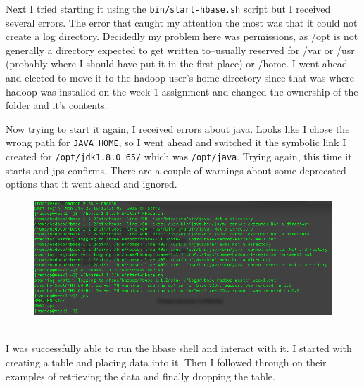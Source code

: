 \documentclass[10pt]{article}
\begin{document}
Next I tried starting it using the \verb|bin/start-hbase.sh| script but I received several errors. The error that caught my attention the most was that it could not create a log directory. Decidedly my problem here was permissions, as /opt is not generally a directory expected to get written to--usually reserved for /var or /usr (probably where I should have put it in the first place) or /home. I went ahead and elected to move it to the hadoop user's home directory since that was where hadoop was installed on the week 1 assignment and changed the ownership of the folder and it's contents.
\par
{}%
\hfill
{}%
\par
Now trying to start it again, I received errors about java. Looks like I chose the wrong path for \verb|JAVA_HOME|, so I went ahead and switched it the symbolic link I created for \verb|/opt/jdk1.8.0_65/| which was \verb|/opt/java|. Trying again, this time it starts and jps confirms. There are a couple of warnings about some deprecated options that it went ahead and ignored. 
\begin{figure}[!h]
\includegraphics[scale=0.37]{started.png}
\centering
\end{figure}\\
\indent I was successfully able to run the hbase shell and interact with it. I started with creating a table and placing data into it. Then I followed through on their examples of retrieving the data and finally dropping the table.
\end{document}
